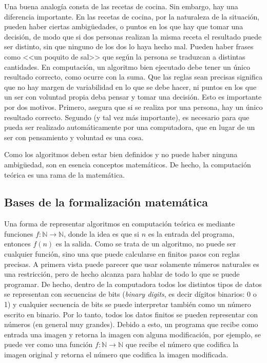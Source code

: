 \documentclass[a4paper, 12pt]{report}
\newcommand{\N}{\mathbb{N}}
\begin{document}
Una buena analogía consta de las recetas de cocina. Sin embargo, hay una diferencia importante. En las recetas de cocina, por la naturaleza de la situación, pueden haber ciertas ambigüedades, o puntos en los que hay que tomar una decisión, de modo que si dos personas realizan la misma receta el resultado puede ser distinto, sin que ninguno de los dos lo haya hecho mal. Pueden haber frases como <<un poquito de sal>> que según la persona se traduzcan a distintas cantidades. En computación, un algoritmo bien ejecutado debe tener un único resultado correcto, como ocurre con la suma. Que las reglas sean precisas significa que no hay margen de variabilidad en lo que se debe hacer, ni puntos en los que un ser con voluntad propia deba pensar y tomar una decisión. Esto es importante por dos motivos. Primero, asegura que si se realiza por una persona, hay un único resultado correcto. Segundo (y tal vez más importante), es necesario para que pueda ser realizado automáticamente por una computadora, que en lugar de un ser con pensamiento y voluntad es una cosa.

Como los algoritmos deben estar bien definidos y no puede haber ninguna ambigüedad, son en esencia conceptos matemáticos. De hecho, la computación teórica es una rama de la matemática.
\subsection{Bases de la formalización matemática}

Una forma de representar algoritmos en computación teórica es mediante funciones $f:\N\to\N$, donde la idea es que si $n$ es la entrada del programa, entonces $f(n)$ es la salida. Como se trata de un algoritmo, no puede ser cualquier función, sino una que puede calcularse en finitos pasos con reglas precisas. A primera vista puede parecer que usar solamente números naturales es una restricción, pero de hecho alcanza para hablar de todo lo que se puede programar. De hecho, dentro de la computadora todos los distintos tipos de datos  se representan con secuencias de bits (\emph{binary digits}, es decir dígitos binarios: 0 o 1) y cualquier secuencia de bits se puede interpretar también como un número escrito en binario. Por lo tanto, todos los datos finitos se pueden representar con números (en general muy grandes). Debido a esto, un programa que recibe como entrada una imagen y retorna la imagen con alguna modificación, por ejemplo, se puede ver como una función $f:\N\to\N$ que recibe el número que codifica la imagen original y retorna el número que codifica la imagen modificada.
\end{document}
